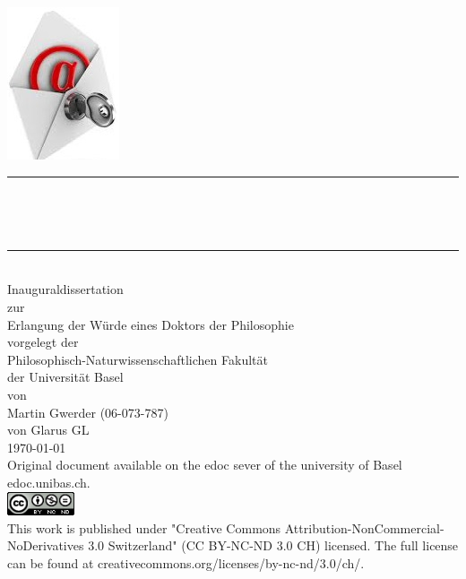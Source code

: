 \begin{titlepage}
\pagecolor{orange}\afterpage{\nopagecolor}
\begin{center}
\includegraphics[height=0.4\textwidth]{./inc/logo.jpg}~\\[1cm]

\newcommand{\HRule}{\rule{\linewidth}{0.5mm}}
\HRule \\[0.4cm]
{ \huge \bfseries \makeatletter\@title\par\normalsize\@subtitle\makeatother \\[0.4cm] }

\HRule \\[4.5cm]

{\large Inauguraldissertation}\\
zur\\
Erlangung der W\"urde eines Doktors der Philosophie\\
vorgelegt der\\
Philosophisch-Naturwissenschaftlichen Fakult\"at\\
der Universit\"at Basel\\
von\\
Martin Gwerder (06-073-787)\\
von Glarus GL\\

\vfill
{\large \today\\[1cm]}
{\footnotesize Original document available on the edoc sever of the university of Basel edoc.unibas.ch.\\[0.5cm]
\includegraphics[height=7mm]{./inc/cclic.png}~\\[0.5cm]
This work is published under  "Creative Commons Attribution-NonCommercial-NoDerivatives 3.0 Switzerland" (CC BY-NC-ND 3.0 CH) licensed. The full license can be found at creativecommons.org/licenses/by-nc-nd/3.0/ch/.
}
\afterpage{\onecolumn}
\end{center}
\end{titlepage}\clearpage\pagestyle{plain}
